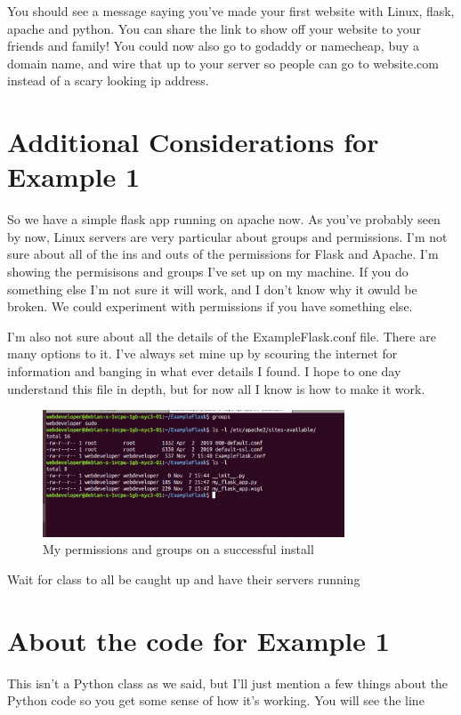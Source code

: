 \documentclass[10pt]{article}
\begin{document}
You should see a message saying you've made your first website with Linux, flask, apache and python. You can share the link to show off your website to your friends and family! You could now also go to godaddy or namecheap, buy a domain name, and wire that up to your server so people can go to website.com instead of a scary looking ip address.

\section{Additional Considerations for Example 1}
So we have a simple flask app running on apache now. As you've probably seen by now, Linux servers are very particular about groups and permissions. I'm not sure about all of the ins and outs of the permissions for Flask and Apache. I'm showing the permisisons and groups I've set up on my machine. If you do something else I'm not sure it will work, and I don't know why it owuld be broken. We could experiment with permissions if you have something else.


I'm also not sure about all the details of the ExampleFlask.conf file. There are many options to it. I've always set mine up by scouring the internet for information and banging in what ever details I found. I hope to one day understand this file in depth, but for now all I know is how to make it work.

\begin{figure}[h]
  \centering
    \includegraphics[width=0.8\textwidth]{groupsAndPermissions.png}
  \caption{My permissions and groups on a successful install}
\end{figure}

{\LARGE Wait for class to all be caught up and have their servers running}

\section{About the code for Example 1}
This isn't a Python class as we said, but I'll just mention a few things about the Python code so you get some sense of how it's working. You will see the line
\end{document}
